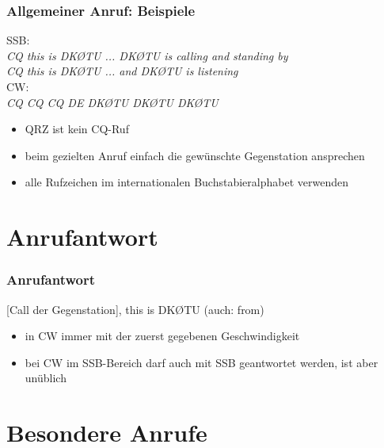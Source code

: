 \begin{frame}
    \frametitle{Allgemeiner Anruf: Beispiele}

    SSB: \\
    \emph{CQ this is DKØTU ... DKØTU is calling and standing by} \\
    \emph{CQ this is DKØTU ... and DKØTU is listening}\\[2em]
    
    CW: \\
    \emph{CQ CQ CQ DE DKØTU DKØTU DKØTU} \\[2em]

    \begin{itemize}
        \item QRZ ist kein CQ-Ruf
        \item beim gezielten Anruf einfach die gewünschte Gegenstation ansprechen
        \item alle Rufzeichen im internationalen Buchstabieralphabet verwenden
    \end{itemize}

\end{frame}

\section{Anrufantwort}

\begin{frame}
    \frametitle{Anrufantwort}

    [Call der Gegenstation], this is DKØTU (auch: from)

    \begin{itemize}
        \item in CW immer mit der zuerst gegebenen Geschwindigkeit
        \item bei CW im SSB-Bereich darf auch mit SSB geantwortet werden, ist aber
              unüblich
    \end{itemize}

\end{frame}

\section{Besondere Anrufe}

